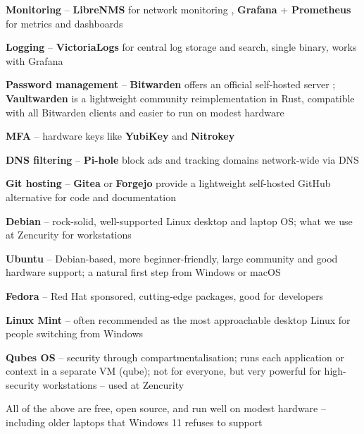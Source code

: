 \documentclass[Screen16to9,17pt]{foils}
\begin{document}


\begin{list2}
\item {\bf Monitoring} -- {\bf LibreNMS} for network monitoring ,
{\bf Grafana} + {\bf Prometheus} for metrics and dashboards 
\item {\bf Logging} -- {\bf VictoriaLogs} for central log storage and search, single binary, works with Grafana 
\item {\bf Password management} -- {\bf Bitwarden} offers an official self-hosted server
; {\bf Vaultwarden} is a lightweight community reimplementation
in Rust, compatible with all Bitwarden clients and easier to run on modest hardware
\item {\bf MFA} -- hardware keys like {\bf YubiKey}  and {\bf Nitrokey} 
\item {\bf DNS filtering} -- {\bf Pi-hole} block ads and
tracking domains network-wide via DNS 
\item {\bf Git hosting} -- {\bf Gitea} or {\bf Forgejo} provide a lightweight self-hosted
GitHub alternative for code and documentation 
\end{list2}



\begin{list2}
\item {\bf Debian} -- rock-solid, well-supported Linux desktop and laptop OS;
what we use at Zencurity for workstations 
\item {\bf Ubuntu} -- Debian-based, more beginner-friendly, large community and
good hardware support; a natural first step from Windows or macOS 
\item {\bf Fedora} -- Red Hat sponsored, cutting-edge packages, good for developers 
\item {\bf Linux Mint} -- often recommended as the most approachable desktop Linux
for people switching from Windows 
\item {\bf Qubes OS} -- security through compartmentalisation; runs each application
or context in a separate VM (qube); not for everyone, but very powerful for
high-security workstations -- used at Zencurity 
\item All of the above are free, open source, and run well on modest hardware --
including older laptops that Windows 11 refuses to support
\end{list2}
\end{document}
